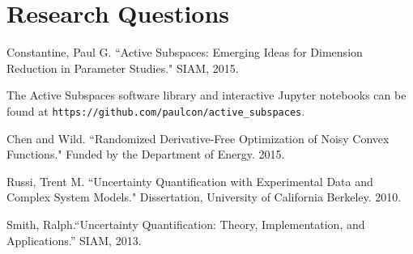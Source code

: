 \documentclass{amsart}
\begin{document}
\section{Research Questions}











\begin{thebibliography}{65}

 Constantine, Paul G. ``Active Subspaces: Emerging Ideas for Dimension Reduction in Parameter Studies." SIAM, 2015. 


The Active Subspaces software library and interactive Jupyter notebooks can be found at \texttt{https://github.com/paulcon/active\_subspaces}.

 Chen and Wild. ``Randomized Derivative-Free Optimization of Noisy Convex Functions." Funded by the Department of Energy. 2015.

 Russi, Trent M. ``Uncertainty Quantification with Experimental Data and Complex System Models." Dissertation, University of California Berkeley. 2010.

  Smith, Ralph.``Uncertainty Quantification: Theory, Implementation, and Applications.” SIAM, 2013.



 



\end{thebibliography}
\end{document}
